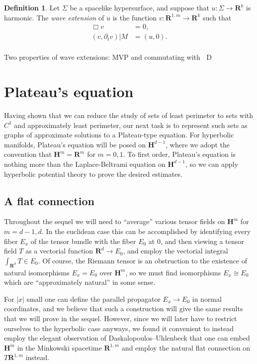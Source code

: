 \documentclass[reqno,12pt,letterpaper]{amsart}
\newcommand{\RR}{\mathbf{R}}
\newcommand{\Hyp}{\mathbf H}
\newcommand*\Dif{\mathop{}\!\mathrm{D}}
\newcommand{\dfn}[1]{\emph{#1}\index{#1}}
\theoremstyle{definition}
\newtheorem{definition}[theorem]{Definition}
\numberwithin{equation}{section}
\begin{document}
\begin{definition}
Let $\Sigma$ be a spacelike hypersurface, and suppose that $u: \Sigma \to \RR^k$ is harmonic.
The \dfn{wave extension} of $u$ is the function $v: \RR^{1, m} \to \RR^k$ such that
\begin{align*}
\Box v &= 0, \\
(v, \partial_t v)|M &= (u, 0).\\
\end{align*}
\end{definition}

Two properties of wave extensions: MVP and commutating with $\Dif$


\section{Plateau's equation}\label{Plateau section}
Having shown that we can reduce the study of sets of least perimeter to sets with $C^1$ and approximately least perimeter, our next task is to represent such sets as graphs of approximate solutions to a Plateau-type equation.
For hyperbolic manifolds, Plateau's equation will be posed on $\Hyp^{d - 1}$, where we adopt the convention that $\Hyp^m = \RR^m$ for $m = 0, 1$.
To first order, Plateau's equation is nothing more than the Laplace-Beltrami equation on $\Hyp^{d - 1}$, so we can apply hyperbolic potential theory to prove the desired estimates.

\subsection{A flat connection}
Throughout the sequel we will need to ``average'' various tensor fields on $\Hyp^m$ for $m = d-1, d$.
In the euclidean case this can be accomplished by identifying every fiber $E_x$ of the tensor bundle with the fiber $E_0$ at $0$, and then viewing a tensor field $T$ as a vectorial function $\RR^d \to E_0$, and employ the vectorial integral $\int_{\RR^d} T \in E_0$.
Of course, the Riemann tensor is an obstruction to the existence of natural isomorphisms $E_x = E_0$ over $\Hyp^m$, so we must find isomorphisms $E_x \cong E_0$ which are ``approximately natural'' in some sense.

For $|x|$ small one can define the parallel propagator $E_x \to E_0$ in normal coordinates, and we believe that such a construction will give the same results that we will prove in the sequel.
However, since we will later have to restrict ourselves to the hyperbolic case anyways, we found it convenient to instead employ the elegant observation of Daskalopoulos--Uhlenbeck \cite{daskalopoulosPrep1} that one can embed $\Hyp^m$ in the Minkowski spacetime $\RR^{1, m}$ and employ the natural flat connection on $T\RR^{1, m}$ instead.
\end{document}
